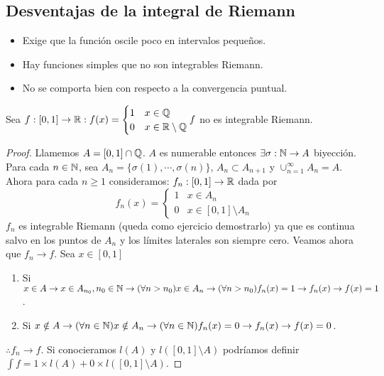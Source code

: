 \subsection{Desventajas de la integral de Riemann}
\begin{itemize}
    \item Exige que la función oscile poco en intervalos pequeños.
    \item Hay funciones simples que no son integrables Riemann.
    \item No se comporta bien con respecto a la convergencia puntual.
\end{itemize}

\begin{eg}
    Sea $f: [0, 1] \to \mathbb{R} : f(x) = \begin{cases}
            1 & x \in \mathbb{Q}              \\
            0 & x \in \mathbb{R} \setminus \mathbb{Q}
        \end{cases} f$ no es integrable Riemann.
    \begin{proof}
        Llamemos $A = [0, 1] \cap \mathbb{Q}$. $A$ es numerable entonces $\exists \sigma: \mathbb{N} \to A$ biyección. Para cada $n \in \mathbb{N}$, sea
        $A_n = \{ \sigma(1), \cdots, \sigma(n) \}$, $A_n \subset A_{n+1}$ y $\cup_{n=1}^{\infty} A_n = A$.
        Ahora para cada $n \geq 1$ consideramos:
        $f_n: [0, 1] \to \mathbb{R}$ dada por
        \begin{equation}
            f_n(x) = \begin{cases}
                1 & x \in A_n                  \\
                0 & x \in [0, 1] \setminus A_n
            \end{cases}
        \end{equation}
        $f_n$ es integrable Riemann (queda como ejercicio demostrarlo) ya que es continua salvo en los puntos de $A_n$ y
        los límites laterales son siempre cero.
        Veamos ahora que $f_n \to f$. Sea $x \in [0, 1]$ \begin{enumerate}
            \item Si $x \in A \to x \in A_{n_0}, n_0 \in \mathbb{N} \to (\forall n > n_0) x \in A_n \to (\forall n > n_0) f_n(x) = 1 \to f_n(x) \to f(x) = 1$.
            \item Si $x \notin A \to (\forall n \in \mathbb{N}) x \notin A_n \to (\forall n \in \mathbb{N}) f_n(x) = 0 \to f_n(x) \to f(x) = 0$.
        \end{enumerate} $\therefore f_n \to f$.
        Si conocieramos $l(A)$ y $l([0, 1] \setminus A)$ podríamos definir $\int f = 1 \times l(A) + 0 \times l([0, 1] \setminus A)$.
    \end{proof}
\end{eg}

